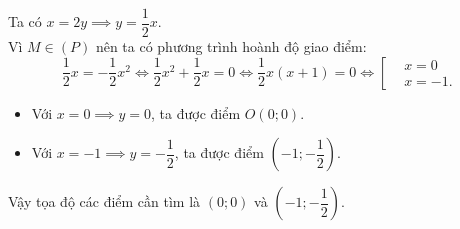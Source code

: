 \begin{bt}
{\begin{enumerate}[a)]
	Ta có $x = 2y \implies y = \dfrac{1}{2}x$.\\
	Vì $M \in (P)$ nên ta có phương trình hoành độ giao điểm:
	$$\dfrac{1}{2}x = -\dfrac{1}{2}x^2 \iff \dfrac{1}{2}x^2 + \dfrac{1}{2}x = 0 \iff \dfrac{1}{2}x(x + 1) = 0 \iff \left[\begin{aligned} &x = 0 \\ &x = -1. \end{aligned}\right.$$
	\begin{itemize}
		\item Với $x = 0 \implies y = 0$, ta được điểm $O(0; 0)$.
		\item Với $x = -1 \implies y = -\dfrac{1}{2}$, ta được điểm $\left(-1; -\dfrac{1}{2}\right)$.
	\end{itemize}
	Vậy tọa độ các điểm cần tìm là $(0; 0)$ và $\left(-1; -\dfrac{1}{2}\right)$.
\end{enumerate}
}
\end{bt}

